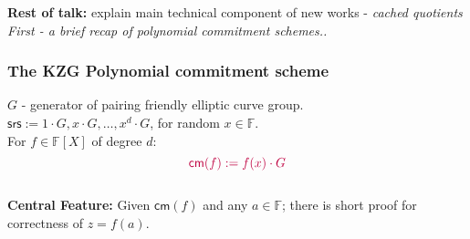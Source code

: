 \documentclass[shadesubsections,compress,14pt,mathserif]{beamer}
\newcommand{\F}{\ensuremath{{\mathbb F}}}
\newcommand{\enc}[1]{\ensuremath{#1\cdot G}}
\newcommand{\cm}{\ensuremath{\mathsf{cm}}}
\newcommand{\defeq}{\ensuremath{:=}}
\newcommand{\nl}{\\ \pause \vspace{0.2in}}
\newcommand{\cq}{\mathpgoth{cq} }
\newcommand{\srs}{\ensuremath{\mathsf{srs}}}
\begin{document}
%  
% 
% 
\begin{frame}
{\large{\textbf{Rest of talk:} explain main technical component of new works - \emph{cached quotients}}}\pause
\emph{First - a brief recap of polynomial commitment schemes..}

 \end{frame}
\begin{frame}
 \frametitle{The KZG Polynomial commitment scheme}   %
 $G$ - generator of pairing friendly elliptic curve group.\\
 \vspace{0.2in}
 $\srs \defeq \enc{1},\enc{x},\ldots,\enc{x^d}$, for random $x\in \F$.\nl
 For $f\in \F[X]$ of degree $d$: 
$$\color{purple} \cm(f)\defeq   \enc{f(x)}$$\nl
 \textbf{Central Feature:}
 Given $\cm(f)$ and any $a\in \F$; there is short proof for correctness of $z=f(a)$. 
\end{frame}
\end{document}
